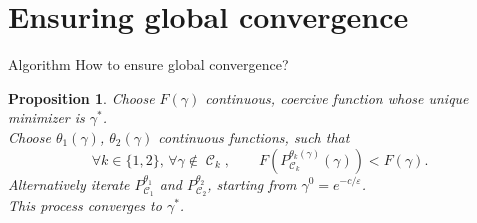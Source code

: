 \documentclass[compress]{beamer}
\DeclareMathOperator{\Ccal}{\mathcal{C}}
\renewcommand{\epsilon}{\varepsilon}
\newtheorem{proposition}{Proposition}
\begin{document}
\section{Ensuring global convergence}

\begin{frame}{Algorithm}
How to ensure global convergence?
\pause
\begin{proposition}
Choose $F(\gamma)$ continuous, coercive function whose unique minimizer is $\gamma^*$.\\
Choose $\theta_1(\gamma)$, $\theta_2(\gamma)$ continuous functions, such that
\begin{equation*}\label{eq:cond_theta_k}
\forall k \in \{1,2\}, \, \forall \gamma \notin \Ccal_k,\quad\quad
F(P_{\Ccal_k}^{\theta_k(\gamma)}(\gamma)) < F(\gamma).
\end{equation*}
\pause
Alternatively iterate $P_{\Ccal_1}^{\theta_1}$ and $P_{\Ccal_2}^{\theta_2}$, starting from $\gamma^0 = e^{-c/\epsilon}$.\\
This process converges to $\gamma^*$.
\end{proposition}
\end{frame}
\end{document}
